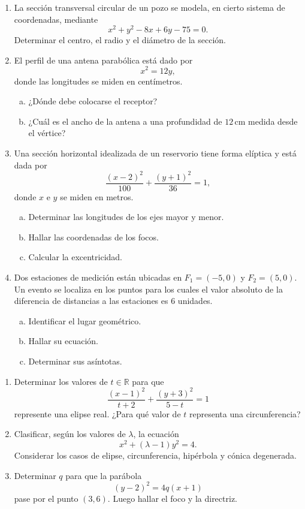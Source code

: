 \documentclass[11pt]{article}
\newcommand{\R}{\mathbb{R}}
\def\identacion{-2.5mm}%
\begin{document}
\begin{enumerate}[\hspace*{\identacion}1)]
\item La sección transversal circular de un pozo se modela, en cierto sistema de coordenadas, mediante
\[
x^2+y^2-8x+6y-75=0.
\]
Determinar el centro, el radio y el diámetro de la sección.

\item El perfil de una antena parabólica está dado por
\[
x^2=12y,
\]
donde las longitudes se miden en centímetros.
\begin{enumerate}[a)]
    \item ¿Dónde debe colocarse el receptor?
    \item ¿Cuál es el ancho de la antena a una profundidad de $12\,\text{cm}$ medida desde el vértice?
\end{enumerate}

\item Una sección horizontal idealizada de un reservorio tiene forma elíptica y está dada por
\[
\frac{(x-2)^2}{100}+\frac{(y+1)^2}{36}=1,
\]
donde $x$ e $y$ se miden en metros.
\begin{enumerate}[a)]
    \item Determinar las longitudes de los ejes mayor y menor.
    \item Hallar las coordenadas de los focos.
    \item Calcular la excentricidad.
\end{enumerate}

\item Dos estaciones de medición están ubicadas en $F_1=(-5,0)$ y $F_2=(5,0)$. Un evento se localiza en los puntos para los cuales el valor absoluto de la diferencia de distancias a las estaciones es $6$ unidades.
\begin{enumerate}[a)]
    \item Identificar el lugar geométrico.
    \item Hallar su ecuación.
    \item Determinar sus asíntotas.
\end{enumerate}
\end{enumerate}

\bigskip

\begin{mdframed}[style=EjerSty,frametitle={Actividad 5: parámetros y clasificación}]
\begin{enumerate}
\item Determinar los valores de $t\in\R$ para que
\[
\frac{(x-1)^2}{t+2}+\frac{(y+3)^2}{5-t}=1
\]
represente una elipse real. ¿Para qué valor de $t$ representa una circunferencia?

\item Clasificar, según los valores de $\lambda$, la ecuación
\[
x^2+(\lambda-1)y^2=4.
\]
Considerar los casos de elipse, circunferencia, hipérbola y cónica degenerada.

\item Determinar $q$ para que la parábola
\[
(y-2)^2=4q(x+1)
\]
pase por el punto $(3,6)$. Luego hallar el foco y la directriz.
\end{enumerate}
\end{mdframed}
\end{document}
